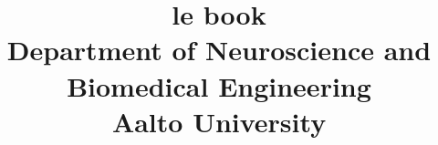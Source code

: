 \documentclass[12pt]{report}
\begin{document}
\title{\textbf{le book} \\ 
\large{\textbf{Department of Neuroscience and Biomedical Engineering}} \\
\large{\textbf{Aalto University}}}

\maketitle
\tableofcontents

\newpage

\newpage

%
%
%
%
%
%
%

\newpage
\printbibliography
\end{document}
